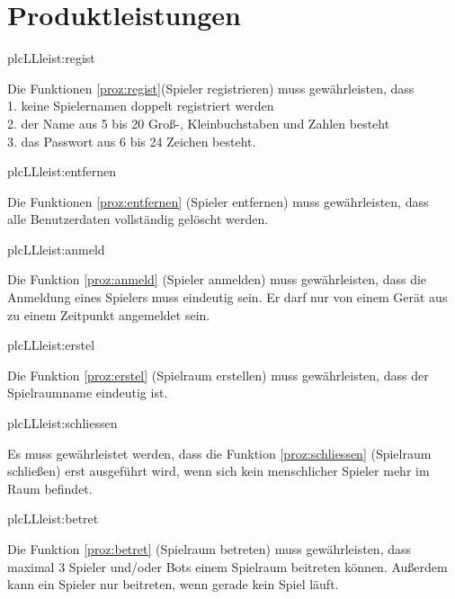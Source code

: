 \chapter{Produktleistungen}

\setcounter{plc}{10}

\begin{description}[leftmargin=5em, style=sameline]

	\begin{lhp}{plc}{LL}{leist:regist}
		\item Die Funktionen \ref{proz:regist}(Spieler registrieren) muss gewährleisten, dass \\
		1. keine Spielernamen doppelt registriert werden \\
		2. der Name aus 5 bis 20 Groß-, Kleinbuchstaben und Zahlen besteht \\
		3. das Passwort aus 6 bis 24 Zeichen besteht.
	\end{lhp}
	
	\begin{lhp}{plc}{LL}{leist:entfernen}
		\item Die Funktionen \ref{proz:entfernen} (Spieler entfernen) muss gewährleisten, dass \\
		 alle Benutzerdaten vollständig gelöscht werden.
	\end{lhp}
	
	\begin{lhp}{plc}{LL}{leist:anmeld}
		\item Die Funktion \ref{proz:anmeld} (Spieler anmelden) muss gewährleisten, dass die Anmeldung eines Spielers muss eindeutig sein. Er darf nur von einem Gerät aus zu einem Zeitpunkt angemeldet sein.
	\end{lhp}
	
	\begin{lhp}{plc}{LL}{leist:erstel}
		\item Die Funktion \ref{proz:erstel} (Spielraum erstellen) muss gewährleisten, dass der Spielraumname eindeutig ist.
	\end{lhp}
	
	\begin{lhp}{plc}{LL}{leist:schliessen}
		\item Es muss gewährleistet werden, dass die Funktion \ref{proz:schliessen} (Spielraum schließen) erst ausgeführt wird, wenn sich kein menschlicher Spieler mehr im Raum befindet.
	\end{lhp}
	
	\begin{lhp}{plc}{LL}{leist:betret}
		\item Die Funktion \ref{proz:betret} (Spielraum betreten) muss gewährleisten, dass maximal 3 Spieler und/oder Bots einem Spielraum beitreten können. Außerdem kann ein Spieler nur beitreten, wenn gerade kein Spiel läuft.
	\end{lhp}
	

\end{description}
